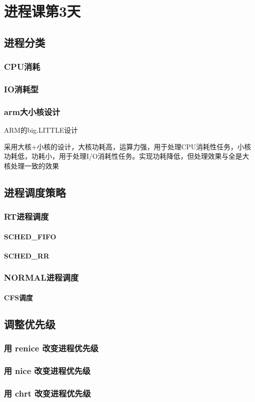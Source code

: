 


\part{进程课第3天}
\chapter{进程分类}
\section{CPU消耗}
 
\section{IO消耗型}

\section{arm大小核设计}
\begin{example*}
  \wdexpbox
  {\caption{ARM的big.LITTLE设计}}
  {采用大核+小核的设计，大核功耗高，运算力强，用于处理CPU消耗性任务，小核功耗低，功耗小，用于处理I/O消耗性任务。实现功耗降低，但处理效果与全是大核处理一致的效果}
\end{example*}

\chapter{进程调度策略}
\section{RT进程调度}
\subsection{SCHED\_FIFO}
\subsection{SCHED\_RR}


\section{NORMAL进程调度}
\subsection{CFS调度}
\clearpage


\chapter{调整优先级}
\section{用 renice 改变进程优先级}
\section{用 nice 改变进程优先级}
\section{用 chrt 改变进程优先级}
\clearpage

